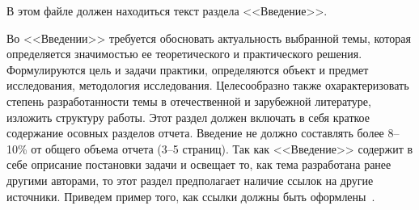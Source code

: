 \intro
В этом файле должен находиться текст раздела <<Введение>>. 


Во <<Введении>>  требуется обосновать актуальность выбранной темы, которая определяется значимостью ее теоретического и практического решения. Формулируются цель и задачи практики, определяются объект и предмет исследования, методология исследования. Целесообразно также охарактеризовать степень разработанности темы в отечественной и зарубежной литературе, изложить структуру работы. Этот раздел должен включать в себя краткое содержание осовных разделов отчета. Введение не должно составлять более 8--10\% от общего объема отчета (3--5 страниц). Так как <<Введение>> содержит в себе оприсание постановки задачи и освещает то, как тема разработана ранее другими авторами, то этот раздел предполагает наличие ссылок на другие источники. Приведем пример того, как ссылки должны быть оформлены~\cite{CitekeyArticle, Boreskov2010}.

